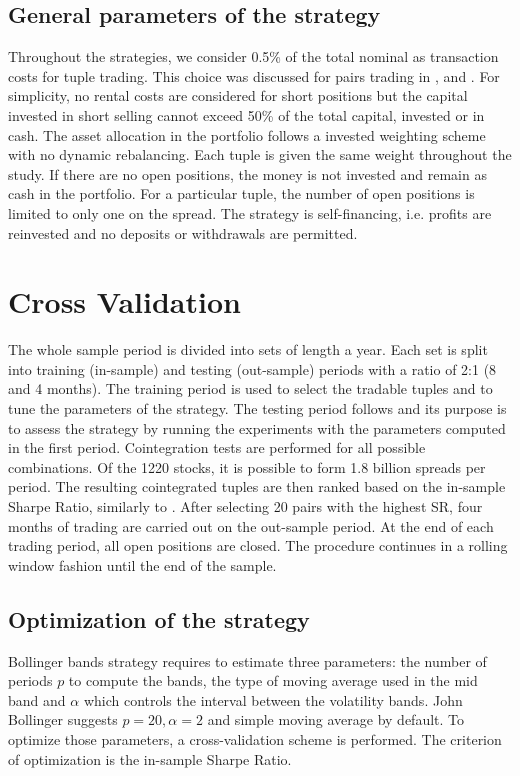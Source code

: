 \documentclass[11pt,a4,twosided,singlespacing,titlepagenumber=on]{scrreprt}
\numberwithin{equation}{chapter} %
\theoremstyle{remark}
\begin{document}
\subsection{General parameters of the strategy}
Throughout the strategies, we consider 0.5\% of the total nominal as transaction costs for tuple trading. This choice was discussed for pairs trading in \cite{dunis2010}, \cite{dunis2005} and \cite{alexander2002}. For simplicity, no rental costs are considered for short positions but the capital invested in short selling cannot exceed 50\% of the total capital, invested or in cash. The asset allocation in the portfolio follows a invested weighting scheme with no dynamic rebalancing. Each tuple is given the same weight throughout the study. If there are no open positions, the money is not invested and remain as cash in the portfolio. For a particular tuple, the number of open positions is limited to only one on the spread. The strategy is self-financing, i.e. profits are reinvested and no deposits or withdrawals are permitted.

\section{Cross Validation}
The whole sample period is divided into sets of length a year. Each set is split into training (in-sample) and testing (out-sample) periods with a ratio of 2:1 (8 and 4 months). The training period is used to select the tradable tuples and to tune the parameters of the strategy. The testing period follows and its purpose is to assess the strategy by running the experiments with the parameters computed in the first period. Cointegration tests are performed for all possible combinations. Of the 1220 stocks, it is possible to form 1.8 billion spreads per period. The resulting cointegrated tuples are then ranked based on the in-sample Sharpe Ratio, similarly to \cite{gatev2006}. After selecting 20 pairs with the highest SR, four months of trading are carried out on the out-sample period. At the end of each trading period, all open positions are closed. The procedure continues in a rolling window fashion until the end of the sample.

\subsection{Optimization of the strategy}

Bollinger bands strategy requires to estimate three parameters: the number of periods $p$ to compute the bands, the type of moving average used in the mid band and $\alpha$ which controls the interval between the volatility bands. John Bollinger suggests $p = 20, \alpha = 2$ and simple moving average by default. To optimize those parameters, a cross-validation scheme is performed. The criterion of optimization is the in-sample Sharpe Ratio.
\end{document}
